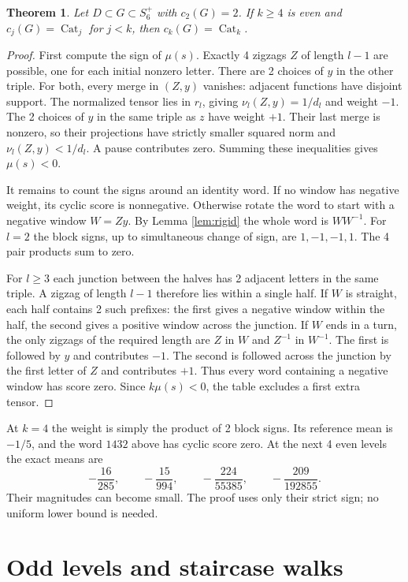 \documentclass[11pt,a4paper]{amsart}
\newtheorem{theorem}{Theorem}[section]
\newcommand{\Cat}{\operatorname{Cat}}
\begin{document}
\begin{theorem}\label{thm:even}
Let $D\subset G\subset S_6^+$ with $c_2(G)=2$. If $k\geq4$ is even and $c_j(G)=\Cat_j$ for $j<k$, then $c_k(G)=\Cat_k$.
\end{theorem}
\begin{proof}
First compute the sign of $\mu(s)$. Exactly 4 zigzags $Z$ of length $l-1$ are possible, one for each initial nonzero letter. There are 2 choices of $y$ in the other triple. For both, every merge in $(Z,y)$ vanishes: adjacent functions have disjoint support. The normalized tensor lies in $r_l$, giving $\nu_l(Z,y)=1/d_l$ and weight $-1$. The 2 choices of $y$ in the same triple as $z$ have weight $+1$. Their last merge is nonzero, so their projections have strictly smaller squared norm and $\nu_l(Z,y)<1/d_l$. A pause contributes zero. Summing these inequalities gives $\mu(s)<0$.

It remains to count the signs around an identity word. If no window has negative weight, its cyclic score is nonnegative. Otherwise rotate the word to start with a negative window $W=Zy$. By Lemma \ref{lem:rigid} the whole word is $WW^{-1}$. For $l=2$ the block signs, up to simultaneous change of sign, are $1,-1,-1,1$. The 4 pair products sum to zero.

For $l\geq3$ each junction between the halves has 2 adjacent letters in the same triple. A zigzag of length $l-1$ therefore lies within a single half. If $W$ is straight, each half contains 2 such prefixes: the first gives a negative window within the half, the second gives a positive window across the junction. If $W$ ends in a turn, the only zigzags of the required length are $Z$ in $W$ and $Z^{-1}$ in $W^{-1}$. The first is followed by $y$ and contributes $-1$. The second is followed across the junction by the first letter of $Z$ and contributes $+1$. Thus every word containing a negative window has score zero. Since $k\mu(s)<0$, the table excludes a first extra tensor.
\end{proof}

At $k=4$ the weight is simply the product of 2 block signs. Its reference mean is $-1/5$, and the word $1432$ above has cyclic score zero. At the next 4 even levels the exact means are
\[
 -\frac{16}{285},\qquad -\frac{15}{994},\qquad
 -\frac{224}{55385},\qquad -\frac{209}{192855}.
\]
Their magnitudes can become small. The proof uses only their strict sign; no uniform lower bound is needed.

\section{Odd levels and staircase walks}\label{sec:odd}
\end{document}
